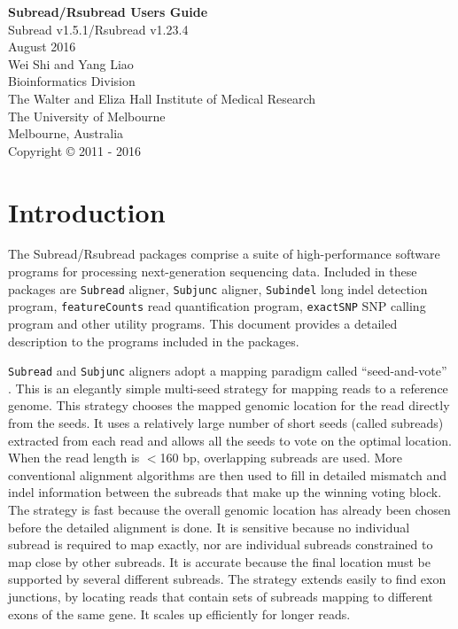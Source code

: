 \documentclass[12pt]{report}
\newcommand{\code}[1]{{\small\texttt{#1}}}
\begin{document}
\begin{titlepage}

\begin{center}
{\Huge\bf Subread/Rsubread Users Guide}\\
\vspace{1 cm}
{\centering\large Subread v1.5.1/Rsubread v1.23.4\\}
\vspace{1 cm}
 August 2016\\
\vspace{5 cm}
\Large Wei Shi and Yang Liao\\
\vspace{1 cm}
\small
{\large Bioinformatics Division\\
The Walter and Eliza Hall Institute of Medical Research\\
The University of Melbourne\\
Melbourne, Australia\\}
\vspace{7 cm}
\centering Copyright \small{\copyright}  2011 - 2016\\
\end{center}

\end{titlepage}

\tableofcontents

\chapter{Introduction}

The Subread/Rsubread packages comprise a suite of high-performance software programs for processing next-generation sequencing data.
Included in these packages are \code{Subread} aligner, \code{Subjunc} aligner, \code{Subindel} long indel detection program, \code{featureCounts} read quantification program, \code{exactSNP} SNP calling program and other utility programs.
This document provides a detailed description to the programs included in the packages.

\code{Subread} and \code{Subjunc} aligners adopt a mapping paradigm called ``seed-and-vote'' \cite{liao}.
This is an elegantly simple multi-seed strategy for mapping reads to a reference genome. 
This strategy chooses the mapped genomic location for the read directly from the seeds.
It uses a relatively large number of short seeds (called subreads) extracted from each read and allows all the seeds to vote on the optimal location.
When the read length is $<$160 bp, overlapping subreads are used.
More conventional alignment algorithms are then used to fill in detailed mismatch and indel information between the subreads that make up the winning voting block.
The strategy is fast because the overall genomic location has already been chosen before the detailed alignment is done.
It is sensitive because no individual subread is required to map exactly, nor are individual subreads constrained to map close by other subreads.
It is accurate because the final location must be supported by several different subreads. The strategy extends easily to find exon junctions, by locating reads that contain sets of subreads mapping to different exons of the same gene.
It scales up efficiently for longer reads.
\end{document}

